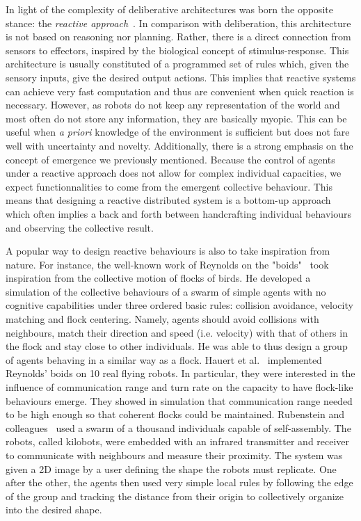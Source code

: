       In light of the complexity of deliberative architectures was born the opposite stance: the \emph{reactive approach}~\parencite{Brooks1986}. In comparison with deliberation, this architecture is not based on reasoning nor planning. Rather, there is a direct connection from sensors to effectors, inspired by the biological concept of stimulus-response. This architecture is usually constituted of a programmed set of rules which, given the sensory inputs, give the desired output actions. This implies that reactive systems can achieve very fast computation and thus are convenient when quick reaction is necessary. However, as robots do not keep any representation of the world and most often do not store any information, they are basically myopic. This can be useful when \emph{a priori} knowledge of the environment is sufficient but does not fare well with uncertainty and novelty. Additionally, there is a strong emphasis on the concept of emergence we previously mentioned. Because the control of agents under a reactive approach does not allow for complex individual capacities, we expect functionnalities to come from the emergent collective behaviour. This means that designing a reactive distributed system is a bottom-up approach which often implies a back and forth between handcrafting individual behaviours and observing the collective result.

      A popular way to design reactive behaviours is also to take inspiration from nature. For instance, the well-known work of Reynolds on the "boids"~\parencite{Reynolds1987} took inspiration from the collective motion of flocks of birds. He developed a simulation of the collective behaviours of a swarm of simple agents with no cognitive capabilities under three ordered basic rules: collision avoidance, velocity matching and flock centering. Namely, agents should avoid collisions with neighbours, match their direction and speed (i.e. velocity) with that of others in the flock and stay close to other individuals. He was able to thus design a group of agents behaving in a similar way as a flock. Hauert et al.~\parencite{Hauert2011} implemented Reynolds' boids on 10 real flying robots. In particular, they were interested in the influence of communication range and turn rate on the capacity to have flock-like behaviours emerge. They showed in simulation that communication range needed to be high enough so that coherent flocks could be maintained. Rubenstein and colleagues~\parencite{Rubenstein2014} used a swarm of a thousand individuals capable of self-assembly. The robots, called kilobots, were embedded with an infrared transmitter and receiver to communicate with neighbours and measure their proximity. The system was given a 2D image by a user defining the shape the robots must replicate. One after the other, the agents then used very simple local rules by following the edge of the group and tracking the distance from their origin to collectively organize into the desired shape.


